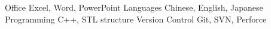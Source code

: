 

\begin{cvskills}

  \cvskill
    {Office} %
    {Excel, Word, PowerPoint} %
  \cvskill
    {Languages} %
    {Chinese, English, Japanese} %
  \cvskill
    {Programming} %
    {C++, STL structure} %
  \cvskill
    {Version Control} %
    {Git, SVN, Perforce} %
\end{cvskills}
